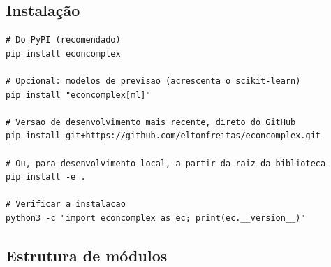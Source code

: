 \documentclass[12pt, a4paper]{article}
\begin{document}
\subsection{Instala\c{c}\~{a}o}

\begin{lstlisting}[style=bashstyle,
  caption={Instala\c{c}\~{a}o via pip}]
# Do PyPI (recomendado)
pip install econcomplex

# Opcional: modelos de previsao (acrescenta o scikit-learn)
pip install "econcomplex[ml]"

# Versao de desenvolvimento mais recente, direto do GitHub
pip install git+https://github.com/eltonfreitas/econcomplex.git

# Ou, para desenvolvimento local, a partir da raiz da biblioteca
pip install -e .

# Verificar a instalacao
python3 -c "import econcomplex as ec; print(ec.__version__)"
\end{lstlisting}

\subsection{Estrutura de m\'{o}dulos}
\end{document}
